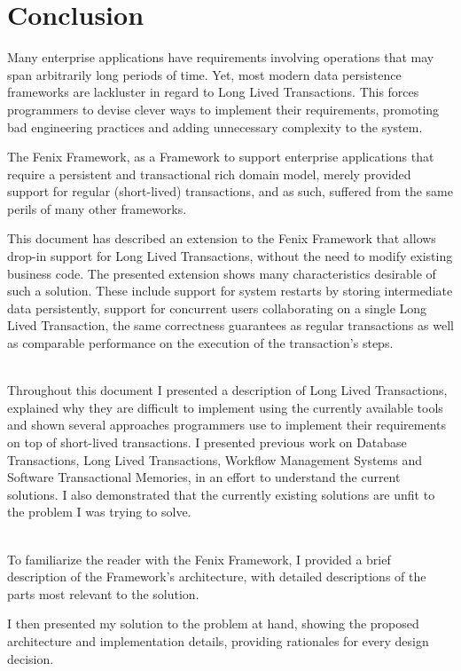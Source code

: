 \chapter{Conclusion}

Many enterprise applications have requirements involving operations
that may span arbitrarily long periods of time. Yet, most modern data
persistence frameworks are lackluster in regard to Long Lived
Transactions. This forces programmers to devise clever ways to
implement their requirements, promoting bad engineering practices and
adding unnecessary complexity to the system.

The Fenix Framework, as a Framework to support enterprise applications
that require a persistent and transactional rich domain model, merely
provided support for regular (short-lived) transactions, and as such,
suffered from the same perils of many other frameworks.

This document has described an extension to the Fenix Framework that
allows drop-in support for Long Lived Transactions, without the need
to modify existing business code. The presented extension shows
many characteristics desirable of such a solution. These include
support for system restarts by storing intermediate data persistently,
support for concurrent users collaborating on a single Long Lived
Transaction, the same correctness guarantees as regular transactions
as well as comparable performance on the execution of the
transaction's steps.

~\\

Throughout this document I presented a description of Long Lived
Transactions, explained why they are difficult to implement using the
currently available tools and shown several approaches programmers use
to implement their requirements on top of short-lived transactions. I
presented previous work on Database Transactions, Long Lived
Transactions, Workflow Management Systems and Software Transactional
Memories, in an effort to understand the current solutions. I also
demonstrated that the currently existing solutions are unfit to the
problem I was trying to solve.

~\\

To familiarize the reader with the Fenix Framework, I provided a brief
description of the Framework's architecture, with detailed
descriptions of the parts most relevant to the solution.

I then presented my solution to the problem at hand, showing the
proposed architecture and implementation details, providing rationales
for every design decision.

